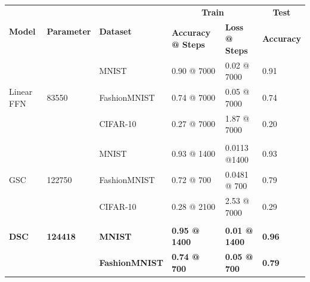 \documentclass{article}
\begin{document}
\begin{table}[H]
\centering
\begin{tabular}{llllll}
\hline
\multirow{2}{*}{\textbf{Model}}   & \multirow{2}{*}{\textbf{Parameter}} & \multirow{2}{*}{\textbf{Dataset}} & \multicolumn{2}{c}{\textbf{Train}}                & \multicolumn{1}{c}{\textbf{Test}} \\ \cline{4-6} 
                                  &                                     &                                   & \textbf{Accuracy @ Steps} & \textbf{Loss @ Steps} & \textbf{Accuracy}                 \\ \cline{1-3}
\multirow{3}{*}{Linear FFN}       & \multirow{3}{*}{83550}          & MNIST                    & 0.90 @ 7000          & 0.02 @ 7000          & 0.91                     \\
                                  &                                 & FashionMNIST             & 0.74 @ 7000          & 0.05 @ 7000          & 0.74                     \\
                                  &                                 & CIFAR-10                 & 0.27 @ 7000          & 1.87 @ 7000          & 0.20                     \\
                                  &                                 &                          &                      &                      &                          \\
\multirow{3}{*}{GSC}              & \multirow{3}{*}{122750}         & MNIST                    & 0.93 @ 1400          & 0.0113 @1400         & 0.93                     \\
                                  &                                 & FashionMNIST             & 0.72 @ 700           & 0.0481 @ 700         & 0.79                     \\
                                  &                                 & CIFAR-10                 & 0.28 @ 2100          & 2.53 @ 7000          & 0.29                     \\
                                  &                                 &                          &                      &                      &                          \\
\textbf{DSC}                      & \textbf{124418}                 & \textbf{MNIST}           & \textbf{0.95 @ 1400} & \textbf{0.01 @ 1400} & \textbf{0.96}            \\
\textbf{}                         & \textbf{}                       & \textbf{FashionMNIST}    & \textbf{0.74 @ 700}  & \textbf{0.05 @ 700}  & \textbf{0.79}            \\

\end{tabular}
\end{table}
\end{document}
